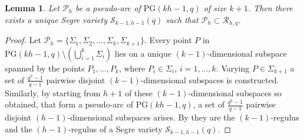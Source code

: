 \documentclass[11pt]{article}
\newtheorem{lemma}[theorem]{Lemma}
\theoremstyle{definition}
\numberwithin{equation}{section}
\def\cP{\mathcal P}
\def\cR{\mathcal R}
\def\cS{\mathcal S}
\def\PG{\mathrm{PG}}
\begin{document}
\begin{lemma}\label{lemma:arc}
Let $\cP_{h}$ be a pseudo-arc of $\PG(kh-1,q)$ of size $k+1$. Then there exists a unique Segre variety $\cS_{k-1, h-1}(q)$ such that $\cP_{h} \subset \cR_{h, q}$.
\end{lemma}
\begin{proof}
Let $\cP_{h} = \{\Sigma_1, \Sigma_2, \dots, \Sigma_k, \Sigma_{k+1}\}$. Every point $P$ in $\PG(kh-1, q) \setminus \left( \bigcup_{i = 1}^k \Sigma_i \right)$ lies on a unique $(k-1)$-dimensional subspace spanned by the points $P_1, \dots, P_k$, where $P_i \in \Sigma_i$, $i = 1, \dots, k$. Varying $P \in \Sigma_{k+1}$ a set of $\frac{q^h-1}{q-1}$ pairwise disjoint $(k-1)$-dimensional subspaces is constructed. Similarly, by starting from $h+1$ of these $(k-1)$-dimensional subspaces so obtained, that form a pseudo-arc of $\PG(kh-1, q)$, a set of $\frac{q^k-1}{q-1}$ pairwise disjoint $(h-1)$-dimensional subspaces arises. By \cite{TV} they are the $(k-1)$-regulus and the $(h-1)$-regulus of a Segre variety $\cS_{k-1, h-1}(q)$.
\end{proof}
\end{document}
